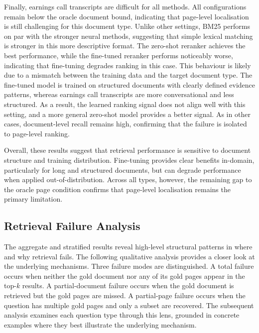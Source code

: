 \documentclass[12pt,twoside,maitrise]{dms}
\newcounter{example}
\theoremstyle{definition}
\numberwithin{equation}{section}
\numberwithin{table}{chapter}
\numberwithin{figure}{chapter}
\begin{document}
Finally, earnings call transcripts are difficult for all methods. All configurations
remain below the oracle document bound, indicating that page-level localisation is still
challenging for this document type. Unlike other settings, BM25 performs on par with the
stronger neural methods, suggesting that simple lexical matching is stronger in
this more descriptive format. The zero-shot reranker achieves the best performance, while
the fine-tuned reranker performs noticeably worse, indicating that fine-tuning degrades
ranking in this case. This behaviour is likely due to a mismatch between the training data
and the target document type. The fine-tuned model is trained on structured documents with
clearly defined evidence patterns, whereas earnings call transcripts are more
conversational and less structured. As a result, the learned ranking signal does not align
well with this setting, and a more general zero-shot model provides a better signal. As in
other cases, document-level recall remains high, confirming that the failure is isolated
to page-level ranking.

Overall, these results suggest that retrieval performance is sensitive to document
structure and training distribution. Fine-tuning provides clear benefits in-domain,
particularly for long and structured documents, but can degrade performance when applied
out-of-distribution. Across all types, however, the remaining gap to the oracle page
condition confirms that page-level localisation remains the primary limitation.


\subsection{Retrieval Failure Analysis}
\label{sec:retrieval_failure}

The aggregate and stratified results reveal high-level structural patterns in where and
why retrieval fails. The following qualitative analysis provides a closer look at the
underlying mechanisms. Three failure modes are distinguished. A total failure
occurs when neither the gold document nor any of its gold pages appear in the top-$k$
results. A partial-document
failure occurs when the gold document is retrieved but the gold pages are missed. A partial-page failure occurs when the question has multiple gold pages and only a
subset are recovered. The subsequent analysis examines each question type through this lens,
grounded in concrete examples where they best illustrate the underlying mechanism.
\end{document}
